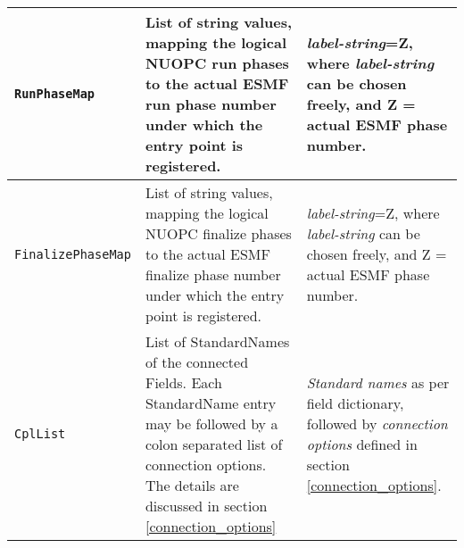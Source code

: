 \begin{longtable}{|p{}|p{}|p{}|}
     {\tt RunPhaseMap} & List of string values, mapping the logical NUOPC run phases to the actual ESMF run phase number under which the entry point is registered.& {\em label-string}=Z, where {\em label-string} can be chosen freely, and Z = actual ESMF phase number. \\ \hline
     {\tt FinalizePhaseMap} & List of string values, mapping the logical NUOPC finalize phases to the actual ESMF finalize phase number under which the entry point is registered.& {\em label-string}=Z, where {\em label-string} can be chosen freely, and Z = actual ESMF phase number. \\ \hline
     {\tt CplList} & List of StandardNames of the connected Fields. Each StandardName entry may be followed by a colon separated list of connection options. The details are discussed in section \ref{connection_options} & {\em Standard names} as per field dictionary, followed by {\em connection options} defined in section \ref{connection_options}.\\ \hline
     \hline
\end{longtable}

